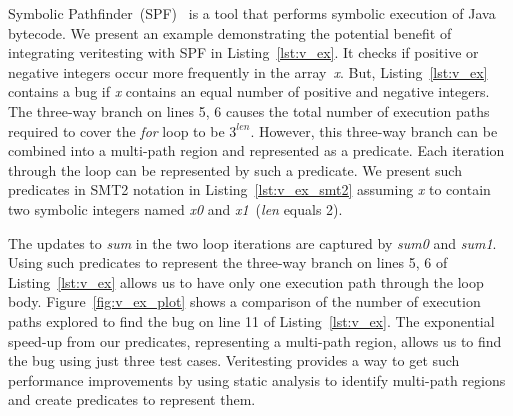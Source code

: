 Symbolic Pathfinder~(SPF)~\cite{spf} is a tool that performs symbolic execution of Java bytecode.
%
%
We present an example demonstrating the potential benefit of integrating veritesting with SPF in Listing~\ref{lst:v_ex}.
%
It checks if positive or negative integers occur more frequently in the
array~\textit{x}.
%
But, Listing~\ref{lst:v_ex} contains a bug if \textit{x} contains an
equal number of positive and negative integers.
%
The three-way branch on lines 5, 6 causes the total number of execution
paths required to cover the \textit{for} loop to be $3^{\textit{len}}$.
%
However, this three-way branch can be combined into a multi-path region
and represented as a predicate.
%
Each iteration through the loop can be represented by such a predicate.
%
We present such predicates in SMT2 notation in
Listing~\ref{lst:v_ex_smt2} assuming \textit{x} to contain two symbolic
integers named \textit{x0} and \textit{x1}~(\textit{len} equals 2).
%

%

%
The updates to \textit{sum} in the two loop iterations are captured by
\textit{sum0} and \textit{sum1}.
%
Using such predicates to represent the three-way branch on lines 5, 6 of
Listing~\ref{lst:v_ex} allows us to have only one execution path through
the loop body.
%
Figure~\ref{fig:v_ex_plot} shows a comparison of the number of execution
paths explored to find the bug on line 11 of Listing~\ref{lst:v_ex}.
%
The exponential speed-up from our predicates, representing a multi-path
region, allows us to find
the bug using just three test cases.
%
Veritesting provides a way to get such performance improvements by using
static analysis to identify multi-path
regions and create predicates to represent them.
%
